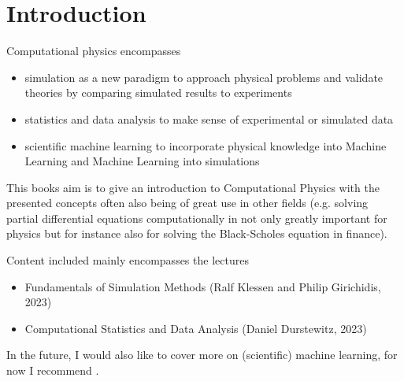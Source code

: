 \section{Introduction}
\thispagestyle{plain}

Computational physics encompasses

\begin{itemize}
    \item simulation as a new paradigm to approach physical problems
    and validate theories by comparing simulated results to experiments
    \item statistics and data analysis to make sense of experimental or simulated data
    \item scientific machine learning to incorporate physical knowledge into Machine Learning and Machine Learning into simulations
\end{itemize}

This books aim is to give an introduction to Computational Physics with the presented concepts often also being
of great use in other fields (e.g. solving partial differential equations computationally in not only
greatly important for physics but for instance also for solving the Black-Scholes equation in finance).

Content included mainly encompasses the lectures

\begin{itemize}
    \item Fundamentals of Simulation Methods (Ralf Klessen and Philip Girichidis, 2023)
    \item Computational Statistics and Data Analysis (Daniel Durstewitz, 2023)
\end{itemize}

In the future, I would also like to cover more on (scientific) machine learning, for
now I recommend \cite{blondel25}.

\pagebreak
